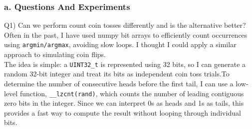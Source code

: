 \documentclass[12pt]{article}
\begin{document}
\subsubsection*{a. Questions And Experiments}
	
Q1) Can we perform count coin tosses differently and is the alternative better?\\

Often in the past, I have used numpy bit arrays to efficiently count occurrences using \texttt{argmin/argmax}, avoiding slow loops. I thought I could apply a similar approach to simulating coin flips.\\

The idea is simple: a \texttt{UINT32\_t} is represented using 32 bits, so I can generate a random 32-bit integer and treat its bits as independent coin toss trials.To determine the number of consecutive heads before the first tail, I can use a low-level function, \texttt{\_\_lzcnt(rand)}, which counts the number of leading contiguous zero bits in the integer. Since we can interpret 0s as heads and 1s as tails, this provides a fast way to compute the result without looping through individual bits.
\end{document}
